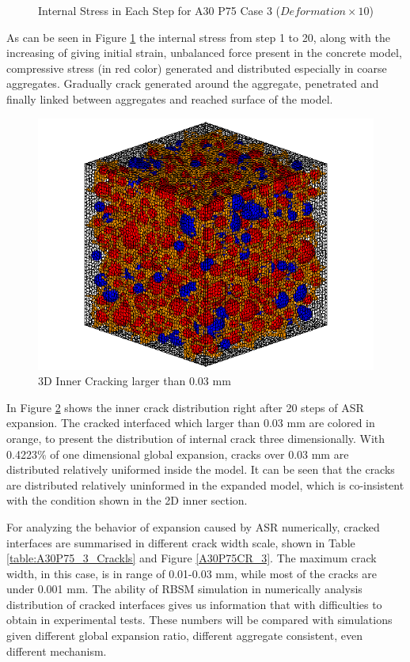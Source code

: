 \begin{figure}[ht!]
      

  \caption{Internal Stress in Each Step for A30 P75 Case 3 ($Deformation \times 10$)}
  \label{fig:ASR_A30P75_3_IS}
  \end{figure}

\clearpage

As can be seen in Figure \ref{fig:ASR_A30P75_3_IS} the internal stress from step 1 to 20, along with the increasing of giving initial strain, unbalanced force present in the concrete model, compressive stress (in red color) generated and distributed especially in coarse aggregates. Gradually crack generated around the aggregate, penetrated and finally linked between aggregates and reached surface of the model.

\begin{figure}[ht!]
\centering
\includegraphics[width=.5\linewidth]{Files/exp_3D/ASR/A30P75_3_c.png}
  \caption{3D Inner Cracking larger than 0.03 mm}
  \label{fig:A30P75_3_crack}
\end{figure}

In Figure \ref{fig:A30P75_3_crack} shows the inner crack distribution right after 20 steps of ASR expansion. The cracked interfaced which larger than 0.03 mm are colored in orange, to present the distribution of internal crack three dimensionally. With 0.4223\% of one dimensional global expansion, cracks over 0.03 mm are distributed relatively uniformed inside the model. It can be seen that the cracks are distributed relatively uninformed in the expanded model, which is co-insistent with the condition shown in the 2D inner section.

For analyzing the behavior of expansion caused by ASR numerically, cracked interfaces are summarised in different crack width scale, shown in Table \ref{table:A30P75_3_Crackls} and Figure \ref{A30P75CR_3}. The maximum crack width, in this case, is in range of 0.01-0.03 mm, while most of the cracks are under 0.001 mm. The ability of RBSM simulation in numerically analysis distribution of cracked interfaces gives us information that with difficulties to obtain in experimental tests. These numbers will be compared with simulations given different global expansion ratio, different aggregate consistent, even different mechanism.

